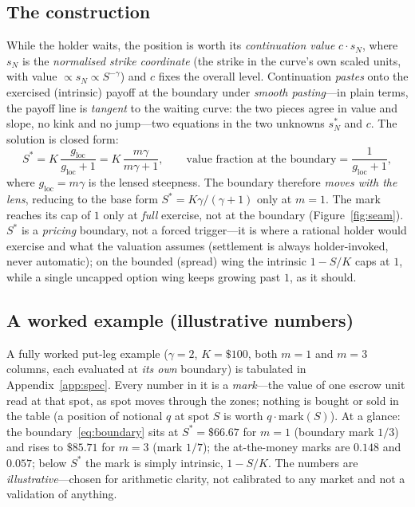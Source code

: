 \documentclass[runningheads]{llncs}
\begin{document}
\subsection{The construction}
While the holder waits, the position is worth its \emph{continuation value}
$c\cdot s_{N}$, where $s_{N}$ is the \emph{normalised strike coordinate} (the
strike in the curve's own scaled units, with value $\propto s_{N}\propto
S^{-\gamma}$) and $c$ fixes the overall level. Continuation \emph{pastes} onto the
exercised (intrinsic) payoff at the boundary under \emph{smooth pasting}---in
plain terms, the payoff line is \emph{tangent} to the waiting curve: the two
pieces agree in value and slope, no kink and no jump---two equations in the two
unknowns
$s_{N}^{\ast}$ and $c$. The solution is closed form:
\begin{equation}
  S^{\ast}=K\,\frac{g_{\mathrm{loc}}}{g_{\mathrm{loc}}+1}
         =K\,\frac{m\gamma}{m\gamma+1},
  \qquad
  \text{value fraction at the boundary}=\frac{1}{g_{\mathrm{loc}}+1},
  \label{eq:boundary}
\end{equation}
where $g_{\mathrm{loc}}=m\gamma$ is the lensed steepness. The boundary therefore
\emph{moves with the lens}, reducing to the base form
$S^{\ast}=K\gamma/(\gamma+1)$ only at $m=1$. The mark reaches its cap of $1$
only at \emph{full} exercise, not at the boundary (Figure~\ref{fig:seam}).
$S^{\ast}$ is a \emph{pricing} boundary, not a forced trigger---it is where a
rational holder would exercise and what the valuation assumes (settlement is
always holder-invoked, never automatic); on the bounded (spread) wing the
intrinsic $1-S/K$ caps at $1$, while a single uncapped option wing keeps
growing past $1$, as it should.

\subsection{A worked example (illustrative numbers)}
A fully worked put-leg example ($\gamma=2$, $K=\$100$, both $m=1$ and $m=3$
columns, each evaluated at \emph{its own} boundary) is tabulated in
Appendix~\ref{app:spec}. Every number in it is a \emph{mark}---the value of
one escrow unit read at that spot, as spot moves through the zones; nothing is
bought or sold in the table (a position of notional $q$ at spot $S$ is worth
$q\cdot\mathrm{mark}(S)$). At a glance: the boundary~\eqref{eq:boundary} sits at
$S^{\ast}=\$66.67$ for $m=1$ (boundary mark $1/3$) and rises to $\$85.71$ for
$m=3$ (mark $1/7$); the at-the-money marks are $0.148$ and $0.057$; below
$S^{\ast}$ the mark is simply intrinsic, $1-S/K$. The numbers are
\emph{illustrative}---chosen for arithmetic clarity, not calibrated to any
market and not a validation of anything.
\end{document}
